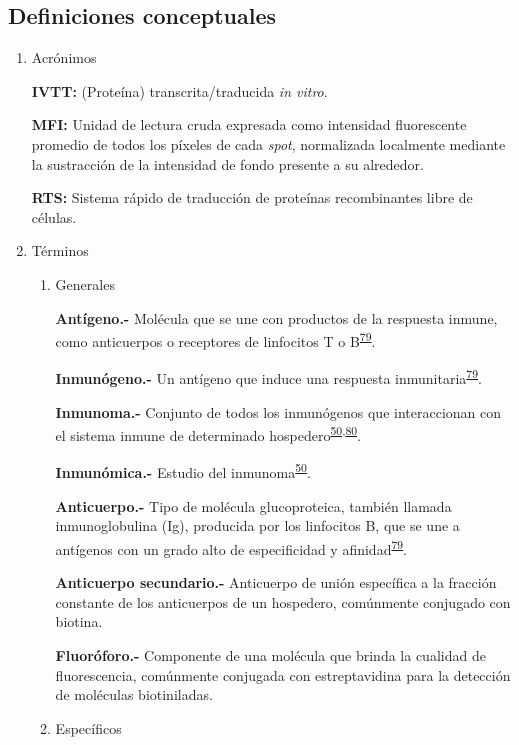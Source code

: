\documentclass[]{article}
\begin{document}
\subsection{Definiciones conceptuales}\label{definiciones-conceptuales}

\begin{enumerate}
\def\labelenumi{\alph{enumi}.}
\item
  Acrónimos

  \textbf{IVTT:} (Proteína) transcrita/traducida \emph{in vitro}.

  \textbf{MFI:} Unidad de lectura cruda expresada como intensidad
  fluorescente promedio de todos los píxeles de cada \emph{spot},
  normalizada localmente mediante la sustracción de la intensidad de
  fondo presente a su alrededor.

  \textbf{RTS:} Sistema rápido de traducción de proteínas recombinantes
  libre de células.
\item
  Términos

  \begin{enumerate}
  \def\labelenumii{\roman{enumii}.}
  \item
    Generales

    \textbf{Antígeno.-} Molécula que se une con productos de la
    respuesta inmune, como anticuerpos o receptores de linfocitos T o
    B\textsuperscript{\protect\hyperlink{ref-abbas2012}{79}}.

    \textbf{Inmunógeno.-} Un antígeno que induce una respuesta
    inmunitaria\textsuperscript{\protect\hyperlink{ref-abbas2012}{79}}.

    \textbf{Inmunoma.-} Conjunto de todos los inmunógenos que
    interaccionan con el sistema inmune de determinado
    hospedero\textsuperscript{\protect\hyperlink{ref-immunomics2016}{50},\protect\hyperlink{ref-sette2005}{80}}.

    \textbf{Inmunómica.-} Estudio del
    inmunoma\textsuperscript{\protect\hyperlink{ref-immunomics2016}{50}}.

    \textbf{Anticuerpo.-} Tipo de molécula glucoproteica, también
    llamada inmunoglobulina (Ig), producida por los linfocitos B, que se
    une a antígenos con un grado alto de especificidad y
    afinidad\textsuperscript{\protect\hyperlink{ref-abbas2012}{79}}.

    \textbf{Anticuerpo secundario.-} Anticuerpo de unión específica a la
    fracción constante de los anticuerpos de un hospedero, comúnmente
    conjugado con biotina.

    \textbf{Fluoróforo.-} Componente de una molécula que brinda la
    cualidad de fluorescencia, comúnmente conjugada con estreptavidina
    para la detección de moléculas biotiniladas.
  \item
    Específicos


\end{enumerate}
\end{enumerate}
\end{document}
